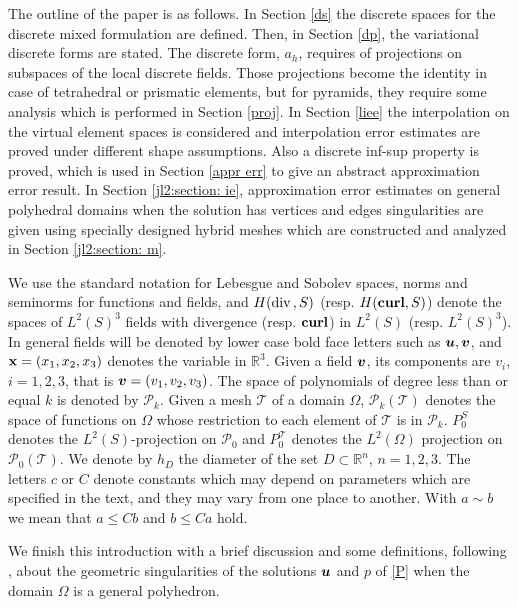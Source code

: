 The outline of the paper is as follows. In Section \ref{ds} the discrete spaces for the discrete mixed formulation are defined. Then, in Section \ref{dp}, the variational discrete forms are stated. The discrete form, $a_h$, requires of projections on subspaces of the local discrete fields. Those projections become the identity in case of tetrahedral or prismatic elements, but for pyramids, they require some analysis which is performed in Section \ref{proj}. In Section \ref{liee} the interpolation on the virtual element spaces is considered and interpolation error estimates are proved under different shape assumptions. Also a discrete inf-sup property is proved, which is used in Section \ref{appr err} to give an abstract approximation error result. In Section \ref{jl2:section: ie}, approximation error estimates on general polyhedral domains when the solution has vertices and edges singularities are given using specially designed hybrid meshes which are constructed and analyzed in Section \ref{jl2:section: m}.

We use the standard notation for Lebesgue and Sobolev spaces, norms and seminorms for functions and fields, and $H(\mbox{div\,},S)$ (resp. $H(\mbox{{\bf curl}}, S)$) denote the spaces of $L^2(S)^3$ fields with divergence (resp. ${\bf curl}$) in $L^2(S)$ (resp. $L^2(S)^3$). In general fields will be denoted by lower case bold face letters such as $\boldsymbol{u}, \boldsymbol{v}$, and ${\bf x}=(x_1, x_2, x_3)$ denotes the variable in $\mathbb R^3$. Given a field $\boldsymbol{v}$, its components are $v_i$, $i=1,2,3$, that is $\boldsymbol{v}=(v_1,v_2,v_3)$. The space of polynomials of degree less than or equal $k$ is denoted by $\mathcal P_k$. Given a mesh $\mathcal T$ of a domain $\Omega$, $\mathcal P_k(\mathcal T)$ denotes the space of functions on $\Omega$ whose restriction to each element of $\mathcal T$ is in $\mathcal P_k$. $P_0^S$ denotes the $L^2(S)$-projection on $\mathcal P_0$ and $P_0^{\mathcal T}$ denotes the $L^2(\Omega)$ projection on $\mathcal P_0(\mathcal T)$. We denote by $h_D$ the diameter of the set $D\subset \mathbb R^n$, $n=1,2,3$. The letters $c$ or $C$ denote constants which may depend on parameters which are specified in the text, and they may vary from one place to another. With $a\sim b$ we mean that $a\le C b$ and $b\le Ca$ hold.   

We finish this introduction with a brief discussion and some definitions, following \cite{AN}, about the geometric singularities of the solutions $\boldsymbol{u}$ and $p$ of \eqref{P} when the domain $\Omega$ is a general polyhedron.


